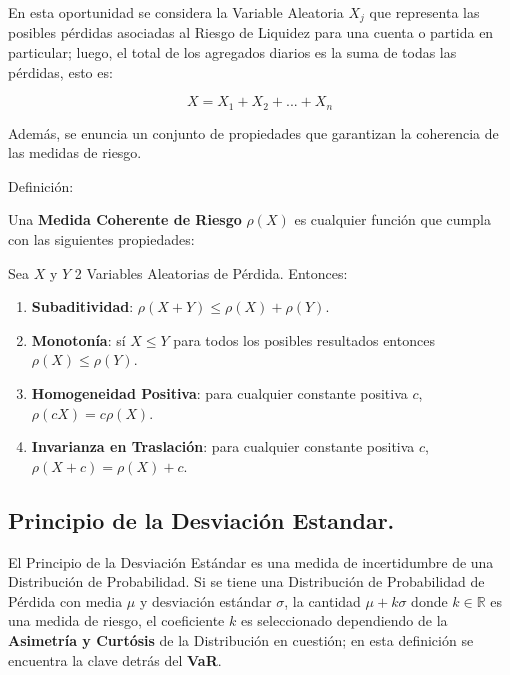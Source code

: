 \documentclass[]{article}
\providecommand{\tightlist}{%
  \setlength{\itemsep}{0pt}\setlength{\parskip}{0pt}}
\begin{document}
En esta oportunidad se considera la Variable Aleatoria \(X_j\) que
representa las posibles pérdidas asociadas al Riesgo de Liquidez para
una cuenta o partida en particular; luego, el total de los agregados
diarios es la suma de todas las pérdidas, esto es:

\[X=X_1+X_2+...+X_n\]

Además, se enuncia un conjunto de propiedades que garantizan la
coherencia de las medidas de riesgo.

Definición:

Una \textbf{Medida Coherente de Riesgo} \(\rho(X)\) es cualquier función
que cumpla con las siguientes propiedades:

Sea \(X\) y \(Y\) 2 Variables Aleatorias de Pérdida. Entonces:

\begin{enumerate}
\def\labelenumi{\arabic{enumi})}
\tightlist
\item
  \textbf{Subaditividad}: \(\rho(X+Y) \leq \rho(X)+\rho(Y)\).\\
\item
  \textbf{Monotonía}: sí \(X \leq Y\) para todos los posibles resultados
  entonces \(\rho(X)\leq\rho(Y)\).\\
\item
  \textbf{Homogeneidad Positiva}: para cualquier constante positiva
  \(c\), \(\rho(cX)=c\rho(X)\).\\
\item
  \textbf{Invarianza en Traslación}: para cualquier constante positiva
  \(c\), \(\rho(X+c)=\rho(X)+c\).
\end{enumerate}

\hypertarget{principio-de-la-desviacion-estandar.}{%
\subsection{\texorpdfstring{\textbf{Principio de la Desviación
Estandar.}}{Principio de la Desviación Estandar.}}\label{principio-de-la-desviacion-estandar.}}

El Principio de la Desviación Estándar es una medida de incertidumbre de
una Distribución de Probabilidad. Si se tiene una Distribución de
Probabilidad de Pérdida con media \(\mu\) y desviación estándar
\(\sigma\), la cantidad \(\mu+k\sigma\) donde \(k\in \mathbb{R}\) es una
medida de riesgo, el coeficiente \(k\) es seleccionado dependiendo de la
\textbf{Asimetría y Curtósis} de la Distribución en cuestión; en esta
definición se encuentra la clave detrás del \textbf{VaR}.
\end{document}
